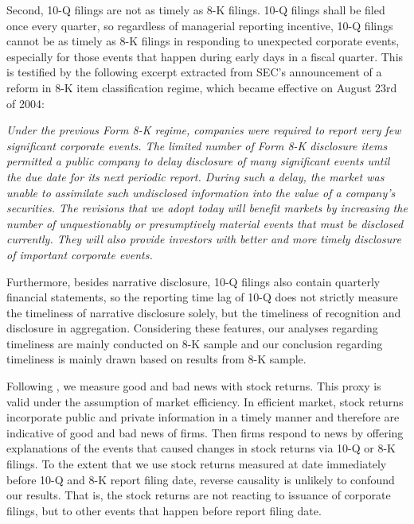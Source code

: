 \documentclass[a4paper]{article}
\begin{document}
\begin{spacing}{2}
Second, 10-Q filings are not as timely as 8-K filings. 10-Q filings shall be filed once every quarter, so regardless of managerial reporting incentive, 10-Q filings cannot be as timely as 8-K filings in responding to unexpected corporate events, especially for those events that happen during early days in a fiscal quarter. This is testified by the following excerpt extracted from SEC's announcement of a reform in 8-K item classification regime, which became effective on August 23rd of 2004: 

\textit{Under the previous Form 8-K regime, companies were required to report very few significant corporate events. The limited number of Form 8-K disclosure items permitted a public company to delay disclosure of many significant events until the due date for its next periodic report. During such a delay, the market was unable to assimilate such undisclosed information into the value of a company's securities. The revisions that we adopt today will benefit markets by increasing the number of unquestionably or presumptively material events that must be disclosed currently. They will also provide investors with better and more timely disclosure of important corporate events.}

\begin{flushright}
	\citep[Final Rule: Additional Form 8-K Disclosure Requirements and Acceleration of Filing Date,][]{secFinalRuleAdditional2004}
\end{flushright}

Furthermore, besides narrative disclosure, 10-Q filings also contain quarterly financial statements, so the reporting time lag of 10-Q does not strictly measure the timeliness of narrative disclosure solely, but the timeliness of recognition and disclosure in aggregation. Considering these features, our analyses regarding timeliness are mainly conducted on 8-K sample and our conclusion regarding timeliness is mainly drawn based on results from 8-K sample.

Following \citet{basuConservatismPrincipleAsymmetric1997}, we measure good and bad news with stock returns. This proxy is valid under the assumption of market efficiency. In efficient market, stock returns incorporate public and private information in a timely manner and therefore are indicative of good and bad news of firms. %
Then firms respond to news by offering explanations of the events that caused changes in stock returns via 10-Q or 8-K filings. To the extent that we use stock returns measured at date immediately before 10-Q and 8-K report filing date, reverse causality is unlikely to confound our results. That is, the stock returns are not reacting to issuance of corporate filings, but to other events that happen before report filing date.


\end{spacing}
\end{document}
